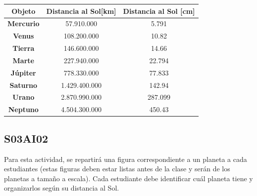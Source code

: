 \documentclass[10pt,a4paper]{article}
\begin{document}
\begin{table}[H]
\begin{tabular}{|c|c|c|}
\hline
\textbf{Objeto}   & \textbf{Distancia al Sol{[}km{]}}                                      & \textbf{Distancia al Sol  {[}cm{]}} \\ \hline
\textbf{Mercurio} &  57.910.000    & 5.791                   \\ \hline
\textbf{Venus}    & 108.200.000   & 10.82                   \\ \hline
\textbf{Tierra}   & 146.600.000  & 14.66                   \\ \hline
\textbf{Marte}    & 227.940.000    & 22.794                  \\ \hline
\textbf{Júpiter}  & 778.330.000   & 77.833                  \\ \hline
\textbf{Saturno}  & 1.429.400.000 & 142.94                  \\ \hline
\textbf{Urano}    & 2.870.990.000   & 287.099                 \\ \hline
\textbf{Neptuno}  & 4.504.300.000     & 450.43                  \\ \hline
\end{tabular}
\end{table}

\subsection{S03AI02}
Para esta actividad, se repartirá una figura correspondiente a un planeta a cada estudiantes (estas figuras deben estar listas antes de la clase y serán de los planetas a tamaño a escala). Cada estudiante debe identificar cuál planeta tiene y organizarlos según su distancia al Sol. \\
\end{document}
